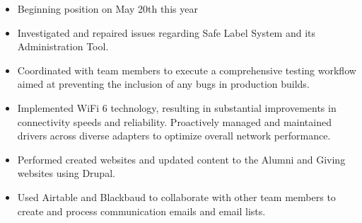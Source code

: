 \documentclass[10pt,a4paper,ragged2e,withhyper]{altacv}
\begin{document}
    
    \begin{paracol}{2}
    

        
    

    \begin{itemize}
\item Beginning position on May 20th this year
\end{itemize}
    \newline

    \divider

\begin{itemize}
\item Investigated and repaired issues regarding Safe Label System and its Administration Tool.
\item Coordinated with team members to execute a comprehensive testing workflow aimed at preventing the inclusion of any bugs in production builds.
\item Implemented WiFi 6 technology, resulting in substantial improvements in connectivity speeds and reliability. Proactively managed and maintained drivers across diverse adapters to optimize overall network performance.
\end{itemize}
    \smallskip \smallskip
    \newline
    \newline
    
    \divider
    

\begin{itemize}
\item Performed created websites and updated content to the Alumni and Giving websites using Drupal. 
\item Used Airtable and Blackbaud to collaborate with other team members to create and process communication emails and email lists. 
    \end{itemize}
    

\end{paracol}
\end{document}
